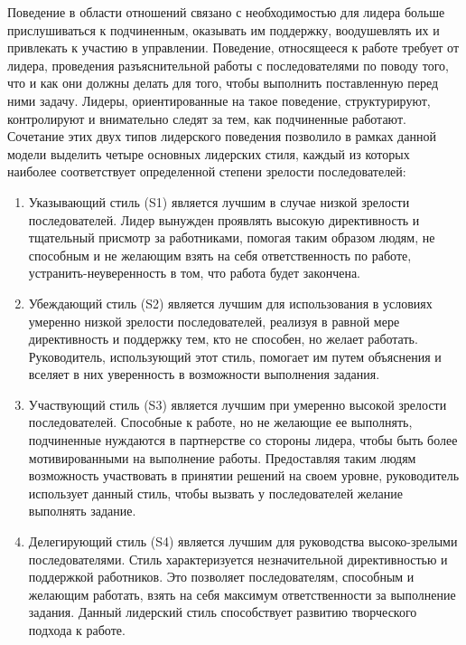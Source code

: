 \documentclass[a4paper,12pt,oneside,final]{extarticle}
\numberwithin{equation}{section}
\begin{document}
Поведение в области отношений связано с необходимостью для лидера больше прислушиваться к подчиненным, оказывать им поддержку, воодушевлять их и привлекать к участию в управлении. 
Поведение, относящееся к работе требует от лидера, проведения разъяснительной работы с последователями по поводу того, что и как они должны делать для того, чтобы выполнить поставленную перед ними задачу. 
Лидеры, ориентированные на такое поведение, структурируют, контролируют и внимательно следят за тем, как подчиненные работают. 
Сочетание этих двух типов лидерского поведения позволило в рамках данной модели выделить четыре основных лидерских стиля, каждый из которых наиболее соответствует определенной степени зрелости последователей:
\begin{enumerate}
	\item Указывающий стиль (S1) является лучшим в случае низкой зрелости последователей. 
	Лидер вынужден проявлять высокую директивность и тщательный присмотр за работниками, помогая таким образом людям, не способным и не желающим взять на себя ответственность по работе, устранить-неуверенность в том, что работа будет закончена.
	\item Убеждающий стиль (S2) является лучшим для использования в условиях умеренно низкой зрелости последователей, реализуя в равной мере директивность и поддержку тем, кто не способен, но желает работать. 
	Руководитель, использующий этот стиль, помогает им путем объяснения и вселяет в них уверенность в возможности выполнения задания.
	\item Участвующий стиль (S3) является лучшим при умеренно высокой зрелости последователей. 
	Способные к работе, но не желающие ее выполнять, подчиненные нуждаются в партнерстве со стороны лидера, чтобы быть более мотивированными на выполнение работы. 
	Предоставляя таким людям возможность участвовать в принятии решений на своем уровне, руководитель использует данный стиль, чтобы вызвать у последователей желание выполнять задание.
	\item Делегирующий стиль (S4) является лучшим для руководства высоко-зрелыми последователями. 
	Стиль характеризуется незначительной директивностью и поддержкой работников. 
	Это позволяет последователям, способным и желающим работать, взять на себя максимум ответственности за выполнение задания. 
	Данный лидерский стиль способствует развитию творческого подхода к работе.
\end{enumerate}
\end{document}
